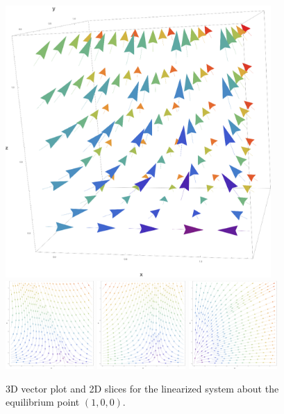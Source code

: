 \documentclass[10pt]{article}
\newcommand{\np}{\vfill\newpage}
\begin{document}
\np
\begin{figure}[h!]
\centering
\includegraphics[width=0.9\textwidth]{firsteqpoint3d.png} \\
\includegraphics[width=0.3\textwidth]{firsteqpointxy.png}
\includegraphics[width=0.3\textwidth]{firsteqpointxz.png}
\includegraphics[width=0.3\textwidth]{firsteqpointyz.png}
\caption{3D vector plot and 2D slices for the linearized system about the equilibrium point \( (1,0,0) \).}
\label{fig:firsteqpoint}
\end{figure}
\np
\end{document}
